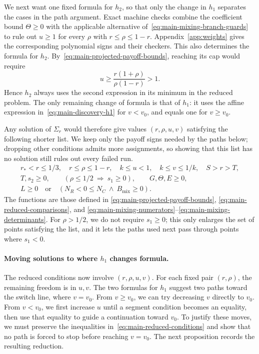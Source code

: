 \documentclass[11pt]{article}
\theoremstyle{remark}
\theoremstyle{plain}
\begin{document}
We next want one fixed formula for $h_2$, so that only the change
in $h_1$ separates the cases in the path argument. Exact machine
checks combine the coefficient bound
$\Theta\ge0$ with the applicable alternative
of~\eqref{eq:main-mixing-branch-guards} to rule out
$u\ge1$ for every $\rho$ with $r\le\rho\le1-r$.
Appendix~\ref{app:weights} gives the corresponding polynomial signs
and their checkers. This also determines the formula for $h_2$.
By~\eqref{eq:main-projected-payoff-bounds}, reaching its cap would
require
\[
 u\ge\frac{r(1+\rho)}{\rho(1-r)}>1.
\]
Hence $h_2$ always uses the second expression in its minimum in
the reduced problem. The only remaining change of formula is that of $h_1$:
it uses the affine expression in~\eqref{eq:main-discovery-h1}
for $v<v_0$, and equals one for $v\ge v_0$.

Any solution of $\Sigma_r$ would therefore give values
$(r,\rho,u,v)$ satisfying the following shorter list. We keep only
the payoff signs needed by the paths below; dropping other
conditions admits more assignments, so showing that this list has
no solution still rules out every failed run.
\begin{equation}
 \begin{gathered}
 r_*<r\le1/3,\quad r\le\rho\le1-r,\quad
 k\le u<1,\quad k\le v\le1/k,\quad S>r>T,\\
 T,s_2\ge0,\qquad (\rho\le1/2\ \Longrightarrow\ s_1\ge0),\qquad
 G,\Theta,E\ge0,\\
 L\ge0\quad\text{or}\quad
 (N_R<0\le N_C\ \land\ B_{\mathrm{mix}}\ge0).
 \end{gathered}
 \label{eq:main-reduced-conditions}
\end{equation}
The functions are those defined in
\eqref{eq:main-projected-payoff-bounds},
\eqref{eq:main-reduced-comparisons}, and
\eqref{eq:main-mixing-numerators}--\eqref{eq:main-mixing-determinants}.
For $\rho>1/2$, we do not require $s_1\ge0$; this only enlarges the
set of points satisfying the list, and it lets the paths used next
pass through points where $s_1<0$.

\paragraph{Moving solutions to where $h_1$ changes formula.}
The reduced conditions now involve $(r,\rho,u,v)$. For each fixed
pair $(r,\rho)$, the remaining freedom is in $u,v$.
The two formulas for $h_1$ suggest two paths toward the switch
line, where $v=v_0$. From $v\ge v_0$, we can try decreasing $v$
directly to $v_0$. From $v<v_0$,
we first increase $u$ until a segment condition becomes an equality,
then use that equality to guide a continuation toward $v_0$.
To justify these moves, we must preserve the inequalities
in~\eqref{eq:main-reduced-conditions} and show that no path is
forced to stop before reaching $v=v_0$. The next proposition records
the resulting reduction.
\end{document}
